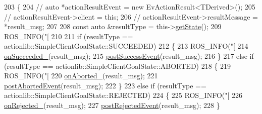 \begin{DoxyCode}
203     \{
204         \textcolor{comment}{// auto *actionResultEvent = new EvActionResult<TDerived>();}
205         \textcolor{comment}{// actionResultEvent->client = this;}
206         \textcolor{comment}{// actionResultEvent->resultMessage = *result\_msg;}
207 
208         \textcolor{keyword}{const} \textcolor{keyword}{auto} &resultType = this->\hyperlink{classsmacc_1_1client__bases_1_1SmaccActionClientBase_a97192acd7bb7cac5de0191e700ab72ee}{getState}();
209         ROS\_INFO(\textcolor{stringliteral}{"[%
210 
211         \textcolor{keywordflow}{if} (resultType == actionlib::SimpleClientGoalState::SUCCEEDED)
212         \{
213             ROS\_INFO(\textcolor{stringliteral}{"[%
214             \hyperlink{classsmacc_1_1client__bases_1_1SmaccActionClientBase_afa1d615e16c9e825d815a3a3ccaa61df}{onSucceeded\_}(result\_msg);
215             \hyperlink{classsmacc_1_1client__bases_1_1SmaccActionClientBase_afb4f82508cd653d496392f321e84a783}{postSuccessEvent}(result\_msg);
216         \}
217         \textcolor{keywordflow}{else} \textcolor{keywordflow}{if} (resultType == actionlib::SimpleClientGoalState::ABORTED)
218         \{
219             ROS\_INFO(\textcolor{stringliteral}{"[%
220             \hyperlink{classsmacc_1_1client__bases_1_1SmaccActionClientBase_adc33748ca4fcef9730f8039b75d496d0}{onAborted\_}(result\_msg);
221             \hyperlink{classsmacc_1_1client__bases_1_1SmaccActionClientBase_a9ca2952ededeec233ee6d8a9a39c680b}{postAbortedEvent}(result\_msg);
222         \}
223         \textcolor{keywordflow}{else} \textcolor{keywordflow}{if} (resultType == actionlib::SimpleClientGoalState::REJECTED)
224         \{
225             ROS\_INFO(\textcolor{stringliteral}{"[%
226             \hyperlink{classsmacc_1_1client__bases_1_1SmaccActionClientBase_a4c878cbf2684701323e2b36668f7d721}{onRejected\_}(result\_msg);
227             \hyperlink{classsmacc_1_1client__bases_1_1SmaccActionClientBase_a04cb60c48127e5534c1ce7045fb5abdc}{postRejectedEvent}(result\_msg);
228         \}
}}}}
\end{DoxyCode}
